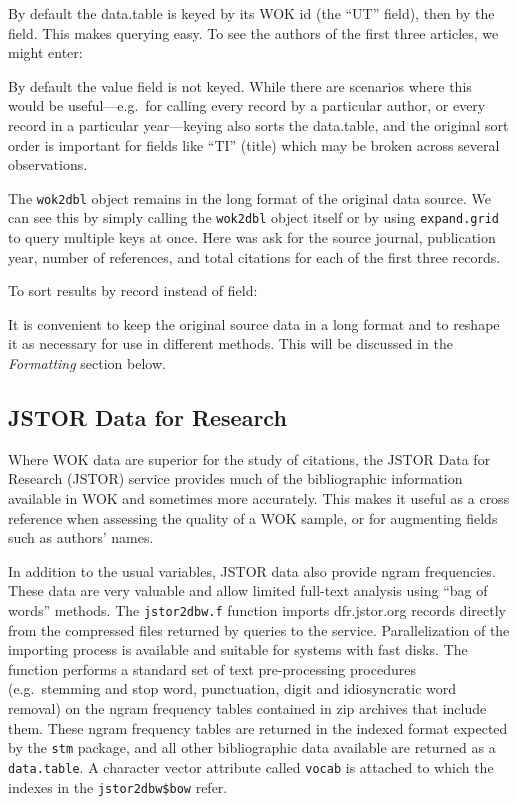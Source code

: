 \documentclass [PhD] {uclathes}
\begin{document}
By default the data.table is keyed by its WOK id (the ``UT'' field),
then by the field. This makes querying easy. To see the authors of the
first three articles, we might enter:

By default the value field is not keyed. While there are scenarios where
this would be useful---e.g.~for calling every record by a particular
author, or every record in a particular year---keying also sorts the
data.table, and the original sort order is important for fields like
``TI'' (title) which may be broken across several observations.

The \texttt{wok2dbl} object remains in the long format of the original
data source. We can see this by simply calling the \texttt{wok2dbl}
object itself or by using \texttt{expand.grid} to query multiple keys at
once. Here was ask for the source journal, publication year, number of
references, and total citations for each of the first three records.

To sort results by record instead of field:

It is convenient to keep the original source data in a long format and
to reshape it as necessary for use in different methods. This will be
discussed in the \emph{Formatting} section below.

\subsection{JSTOR Data for Research}\label{jstor-data-for-research}

Where WOK data are superior for the study of citations, the JSTOR Data
for Research (JSTOR) service provides much of the bibliographic
information available in WOK and sometimes more accurately. This makes
it useful as a cross reference when assessing the quality of a WOK
sample, or for augmenting fields such as authors' names.

In addition to the usual variables, JSTOR data also provide ngram
frequencies. These data are very valuable and allow limited full-text
analysis using ``bag of words'' methods. The \texttt{jstor2dbw.f}
function imports dfr.jstor.org records directly from the compressed
files returned by queries to the service. Parallelization of the
importing process is available and suitable for systems with fast disks.
The function performs a standard set of text pre-processing procedures
(e.g.~stemming and stop word, punctuation, digit and idiosyncratic word
removal) on the ngram frequency tables contained in zip archives that
include them. These ngram frequency tables are returned in the indexed
format expected by the \texttt{stm} package, and all other bibliographic
data available are returned as a \texttt{data.table}. A character vector
attribute called \texttt{vocab} is attached to which the indexes in the
\texttt{jstor2dbw\$bow} refer.
\end{document}
